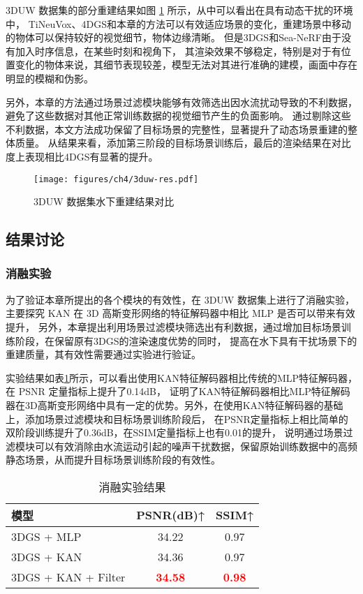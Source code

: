 3DUW 数据集的部分重建结果如图 \ref{img:res_3duw} 所示，从中可以看出在具有动态干扰的环境中，
TiNeuVox\cite{tineuvox}、4DGS\cite{4DGS}和本章的方法可以有效适应场景的变化，重建场景中移动的物体可以保持较好的视觉细节，物体边缘清晰。
但是3DGS\cite{3DGS}和Sea-NeRF\cite{seathru}由于没有加入时序信息，在某些时刻和视角下，
其渲染效果不够稳定，特别是对于有位置变化的物体来说，其细节表现较差，模型无法对其进行准确的建模，画面中存在明显的模糊和伪影。


另外，本章的方法通过场景过滤模块能够有效筛选出因水流扰动导致的不利数据，避免了这些数据对其他正常训练数据的视觉细节产生的负面影响。
通过剔除这些不利数据，本文方法成功保留了目标场景的完整性，显著提升了动态场景重建的整体质量。
从结果来看，添加第三阶段的目标场景训练后，最后的渲染结果在对比度上表现相比4DGS\cite{4DGS}有显著的提升。


\begin{figure}[htbp]
    \centering
    \texttt{[image: figures/ch4/3duw-res.pdf]}
    \caption{3DUW 数据集水下重建结果对比}
    \label{img:res_3duw}
\end{figure}



\subsection{结果讨论}
\subsubsection{消融实验}
为了验证本章所提出的各个模块的有效性，在 3DUW 数据集上进行了消融实验，
主要探究 KAN 在 3D 高斯变形网络的特征解码器中相比 MLP 是否可以带来有效提升，
另外，本章提出利用场景过滤模块筛选出有利数据，通过增加目标场景训练阶段，在保留原有3DGS的渲染速度优势的同时，
提高在水下具有干扰场景下的重建质量，其有效性需要通过实验进行验证。

实验结果如表\ref{tab:recon_ablation}所示，可以看出使用KAN特征解码器相比传统的MLP特征解码器，在 PSNR 定量指标上提升了0.14dB，
证明了KAN特征解码器相比MLP特征解码器在3D高斯变形网络中具有一定的优势。另外，在使用KAN特征解码器的基础上，添加场景过滤模块和目标场景训练阶段后，
在PSNR定量指标上相比简单的双阶段训练提升了0.36dB，在SSIM定量指标上也有0.01的提升，
说明通过场景过滤模块可以有效消除由水流运动引起的噪声干扰数据，保留原始训练数据中的高频静态场景，从而提升目标场景训练阶段的有效性。

\begin{table}
    \centering
    \caption{消融实验结果}
    \label{tab:recon_ablation}
    \begin{tabular}{lcc}
        \toprule
        模型 & PSNR(dB)↑ & SSIM↑ \\
        \midrule
        3DGS + MLP & 34.22 & 0.97 \\
        3DGS + KAN & 34.36 & 0.97\\
        3DGS + KAN + Filter & \textcolor{red}{\textbf{34.58}} & \textcolor{red}{\textbf{0.98}} \\
        \bottomrule
    \end{tabular}
\end{table}


